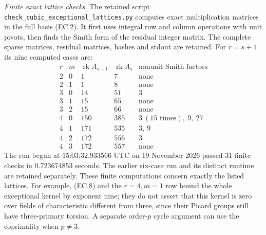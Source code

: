 \noindent\emph{Finite exact lattice checks.}
The retained script \texttt{check\_cubic\_exceptional\_lattices.py}
computes exact multiplication matrices in the full basis (EC.2).
It first uses integral row and column operations with unit pivots,
then finds the Smith form of the residual integer matrix. The complete sparse
matrices, residual matrices, hashes and stdout are retained.
For $r=s+1$ its nine computed cases are:
\[
\begin{array}{c|c|r|r|l}
 r&m&\operatorname{rk}A_{s-1}&\operatorname{rk}A_s
                  &\text{nonunit Smith factors}\\\hline
 2&0&1&7&\text{none}\\
 2&1&1&8&\text{none}\\
 3&0&14&51&3\\
 3&1&15&65&\text{none}\\
 3&2&15&66&\text{none}\\
 4&0&150&385&3\ (15\text{ times}),\ 9,\ 27\\
 4&1&171&535&3,\ 9\\
 4&2&172&556&3\\
 4&3&172&557&\text{none}
\end{array}
 \tag{EC.12}
\]
The run begun at 15:03:32.933566 UTC on 19 November 2026 passed
31 finite checks in 0.723674853 seconds. The earlier six-case run
and its distinct runtime are retained separately. These finite
computations concern exactly the listed lattices. For example,
(EC.8) and the $r=4,m=1$ row bound the whole exceptional kernel
by exponent nine; they do not assert that this kernel is zero
over fields of characteristic different from three, since their
Picard groups still have three-primary torsion. A separate
order-$p$ cycle argument can use the coprimality when $p\ne3$.

